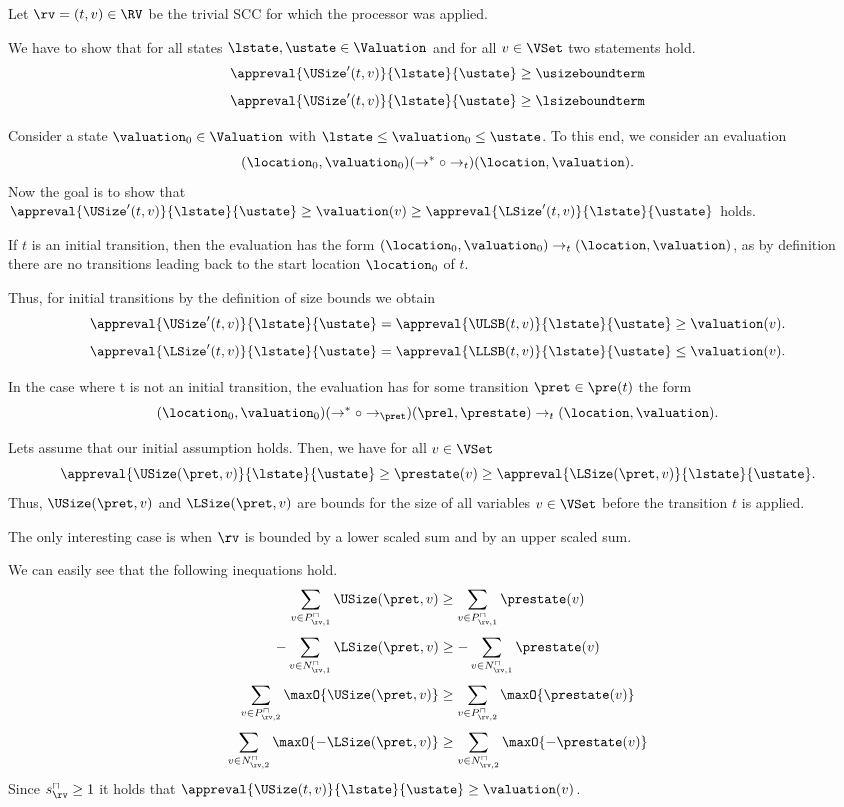 Let $\rv = (t, v) \in \RV$ be the trivial SCC for which the processor was applied.

We have to show that for all states $\lstate, \ustate \in \Valuation$ and for all $v \in \VSet$ two statements hold.
\[ \appreval{\USize'(t, v)}{\lstate}{\ustate} \geq \usizeboundterm \]
\[ \appreval{\USize'(t, v)}{\lstate}{\ustate} \geq \lsizeboundterm \]

Consider a state $\valuation_0 \in \Valuation$ with $\lstate \leq \valuation_0 \leq \ustate$.
To this end, we consider an evaluation
\[ (\location_0, \valuation_0) (\rightarrow^* \circ \rightarrow_t) (\location, \valuation). \]
Now the goal is to show that $\appreval{\USize'(t, v)}{\lstate}{\ustate} \geq \valuation(v) \geq \appreval{\LSize'(t, v)}{\lstate}{\ustate}$ holds.

If $t$ is an initial transition, then the evaluation has the form $(\location_0, \valuation_0) \rightarrow_t (\location, \valuation)$, as by definition there are no transitions leading back to the start location $\location_0$ of $t$.

Thus, for initial transitions by the definition of size bounds we obtain
\[ \appreval{\USize'(t, v)}{\lstate}{\ustate} = \appreval{\ULSB(t, v)}{\lstate}{\ustate} \geq \valuation(v). \]
\[ \appreval{\LSize'(t, v)}{\lstate}{\ustate} = \appreval{\LLSB(t, v)}{\lstate}{\ustate} \leq \valuation(v). \]

In the case where t is not an initial transition, the evaluation has for some transition $\pret \in \pre(t)$ the form
\[ (\location_0, \valuation_0) (\rightarrow^* \circ \rightarrow_\pret) (\prel, \prestate) \rightarrow_t (\location, \valuation). \]

Lets assume that our initial assumption holds.
Then, we have for all $v \in \VSet$
\[ \appreval{\USize(\pret, v)}{\lstate}{\ustate} \geq \prestate(v) \geq \appreval{\LSize(\pret, v)}{\lstate}{\ustate}. \]
Thus, $\USize(\pret, v)$ and $\LSize(\pret, v)$ are bounds for the size of all variables $v \in \VSet$ before the transition $t$ is applied.

The only interesting case is when $\rv$ is bounded by a lower scaled sum and by an upper scaled sum.

We can easily see that the following inequations hold.
\[ \sum_{v \in P_{\rv,1}^\sqcap} \USize(\pret, v) \geq \sum_{v \in P_{\rv,1}^\sqcap} \prestate(v) \]
\[ - \sum_{v \in N_{\rv,1}^\sqcap} \LSize(\pret, v) \geq - \sum_{v \in N_{\rv,1}^\sqcap} \prestate(v) \]
\[ \sum_{v \in P_{\rv,2}^\sqcap} \maxO{\USize(\pret, v)} \geq \sum_{v \in P_{\rv,2}^\sqcap} \maxO{\prestate(v)} \]
\[ \sum_{v \in N_{\rv,2}^\sqcap} \maxO{-\LSize(\pret, v)} \geq \sum_{v \in N_{\rv,2}^\sqcap} \maxO{-\prestate(v)} \]
Since $s^\sqcap_\rv \geq 1$ it holds that $\appreval{\USize(t, v)}{\lstate}{\ustate} \geq \valuation(v)$.

